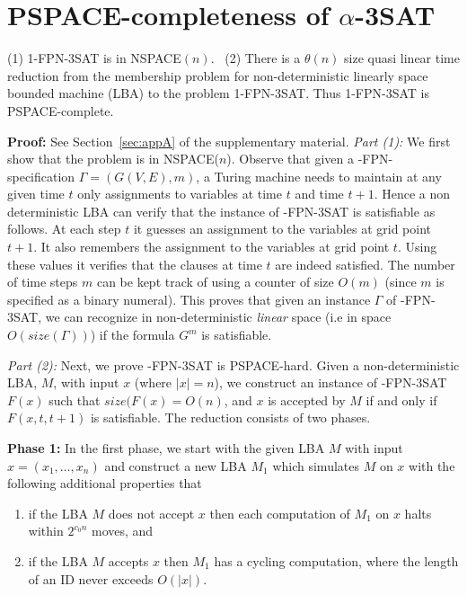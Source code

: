 \section{PSPACE-completeness of $\alpha$-3SAT}\label{sec:hard_3sat}

\begin{theorem}\label{th:fpn-3sat}
(1) 1-FPN-3SAT is in NSPACE$(n)$.~
(2) There is a $\theta(n)$ size 
quasi linear time reduction from the membership problem
for  non-deterministic linearly space bounded machine (LBA) 
to the problem 1-FPN-3SAT. 
Thus 1-FPN-3SAT is {\sf PSPACE}-complete. 
\end{theorem}

\noindent
{\bf Proof:}  See Section~\ref{sec:appA} of the supplementary material. 
\iffalse
{\em Part (1):}
We first show that the problem is in {\sf NSPACE($n$)}.
Observe that given a {-FPN}-specification 
$\Gamma = (G(V,E), m)$, a Turing machine 
needs to maintain at any given time $t$ 
only assignments to variables at time $t$ and time $t+1$. 
Hence a non deterministic {\sf LBA}
can verify that the instance of {-FPN-3SAT} is satisfiable as follows. At 
each step $t$ it guesses an assignment to the variables at grid point $t+1$.
It also remembers the assignment to the variables at grid point $t$. Using
these values it verifies that the clauses at time $t$ are indeed satisfied.
The number of time steps  $m$ can be kept track of using a counter of size
$O(m)$ (since $m$ is specified as a binary numeral). 
This proves that given an instance $\Gamma$ 
of {-FPN-3SAT}, we can recognize in 
non-deterministic {\em linear } space (i.e in space $O(size(\Gamma))$) 
if the formula $G^m$ is satisfiable.

\noindent
{\em Part (2):}
Next, we prove {-FPN-3SAT} is {\sf PSPACE}-hard. 
Given a non-deterministic {\sf LBA},
$M$, with input $x$ (where $|x| = n$), 
we construct an instance of {-FPN-3SAT} $F(x)$ such that
$size(F(x)=  O(n)$,
and $x$ is accepted by $M$ if and only if $F(x,t,t+1)$ is satisfiable.
The reduction consists of two phases. 

\noindent
{\bf Phase 1:}
In the first phase, we
start with the given {\sf LBA} $M$ with input 
$x = (x_1, \ldots, x_n)$ and construct
a new {\sf LBA} $M_1$ which simulates $M$ on $x$ with the
following additional properties that
\begin{enumerate}
\item
if the {\sf LBA} $M$ does not accept $x$ then
each computation of $M_1$ on $x$ halts within $2^{c_0n}$ moves, and 
\item
if the {\sf LBA} $M$ accepts $x$ then $M_1$ has a cycling computation,
where the length of an ID never exceeds $O(|x|)$.

\end{enumerate}



